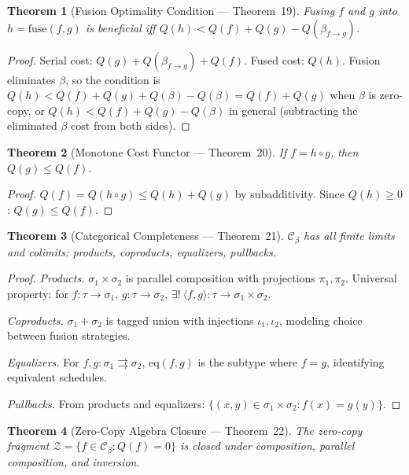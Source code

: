 \documentclass{article}
\newtheorem{theorem}{Theorem}
\theoremstyle{definition}
\theoremstyle{remark}
\begin{document}
\begin{theorem}[Fusion Optimality Condition --- Theorem~19]\label{thm:fusion-optimal}
Fusing $f$ and $g$ into $h = \mathrm{fuse}(f,g)$ is beneficial iff $Q(h) < Q(f) + Q(g) - Q(\beta_{f \to g})$.
\end{theorem}

\begin{proof}
Serial cost: $Q(g) + Q(\beta_{f \to g}) + Q(f)$. Fused cost: $Q(h)$. Fusion eliminates $\beta$, so the condition is $Q(h) < Q(f) + Q(g) + Q(\beta) - Q(\beta) = Q(f) + Q(g)$ when $\beta$ is zero-copy, or $Q(h) < Q(f) + Q(g) - Q(\beta)$ in general (subtracting the eliminated $\beta$ cost from both sides).
\end{proof}

\begin{theorem}[Monotone Cost Functor --- Theorem~20]\label{thm:monotone-functor}
If $f = h \circ g$, then $Q(g) \leq Q(f)$.
\end{theorem}

\begin{proof}
$Q(f) = Q(h \circ g) \leq Q(h) + Q(g)$ by subadditivity. Since $Q(h) \geq 0$: $Q(g) \leq Q(f)$.
\end{proof}

\begin{theorem}[Categorical Completeness --- Theorem~21]\label{thm:completeness}
$\mathcal{C}_\beta$ has all finite limits and colimits: products, coproducts, equalizers, pullbacks.
\end{theorem}

\begin{proof}
\emph{Products.} $\sigma_1 \times \sigma_2$ is parallel composition with projections $\pi_1, \pi_2$. Universal property: for $f : \tau \to \sigma_1$, $g : \tau \to \sigma_2$, $\exists!\ \langle f,g \rangle : \tau \to \sigma_1 \times \sigma_2$.

\emph{Coproducts.} $\sigma_1 + \sigma_2$ is tagged union with injections $\iota_1, \iota_2$, modeling choice between fusion strategies.

\emph{Equalizers.} For $f, g : \sigma_1 \rightrightarrows \sigma_2$, $\mathrm{eq}(f,g)$ is the subtype where $f = g$, identifying equivalent schedules.

\emph{Pullbacks.} From products and equalizers: $\{(x,y) \in \sigma_1 \times \sigma_2 : f(x) = g(y)\}$.
\end{proof}

\begin{theorem}[Zero-Copy Algebra Closure --- Theorem~22]\label{thm:closure}
The zero-copy fragment $\mathcal{Z} = \{f \in \mathcal{C}_\beta : Q(f) = 0\}$ is closed under composition, parallel composition, and inversion.
\end{theorem}
\end{document}
